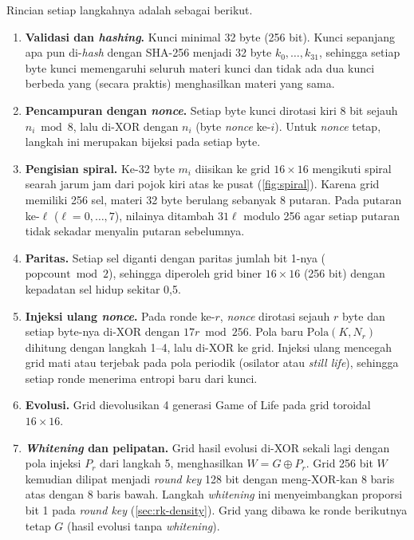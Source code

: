 Rincian setiap langkahnya adalah sebagai berikut.
\begin{enumerate}
    \item \textbf{Validasi dan \textit{hashing}.} Kunci minimal 32 byte (256 bit). Kunci sepanjang apa pun di-\textit{hash} dengan SHA-256 menjadi 32 byte $k_0, \dots, k_{31}$, sehingga setiap byte kunci memengaruhi seluruh materi kunci dan tidak ada dua kunci berbeda yang (secara praktis) menghasilkan materi yang sama.
    \item \textbf{Pencampuran dengan \textit{nonce}.} Setiap byte kunci dirotasi kiri 8 bit sejauh $n_i \bmod 8$, lalu di-XOR dengan $n_i$ (byte \textit{nonce} ke-$i$). Untuk \textit{nonce} tetap, langkah ini merupakan bijeksi pada setiap byte.
    \item \textbf{Pengisian spiral.} Ke-32 byte $m_i$ diisikan ke grid $16 \times 16$ mengikuti spiral searah jarum jam dari pojok kiri atas ke pusat (\cref{fig:spiral}). Karena grid memiliki 256 sel, materi 32 byte berulang sebanyak 8 putaran. Pada putaran ke-$\ell$ ($\ell = 0, \dots, 7$), nilainya ditambah $31\ell$ modulo 256 agar setiap putaran tidak sekadar menyalin putaran sebelumnya.
    \item \textbf{Paritas.} Setiap sel diganti dengan paritas jumlah bit 1-nya ($\mathrm{popcount} \bmod 2$), sehingga diperoleh grid biner $16 \times 16$ (256 bit) dengan kepadatan sel hidup sekitar 0,5.
    \item \textbf{Injeksi ulang \textit{nonce}.} Pada ronde ke-$r$, \textit{nonce} dirotasi sejauh $r$ byte dan setiap byte-nya di-XOR dengan $17r \bmod 256$. Pola baru $\mathrm{Pola}(K, N_r)$ dihitung dengan langkah 1--4, lalu di-XOR ke grid. Injeksi ulang mencegah grid mati atau terjebak pada pola periodik (osilator atau \textit{still life}), sehingga setiap ronde menerima entropi baru dari kunci.
    \item \textbf{Evolusi.} Grid dievolusikan 4 generasi Game of Life pada grid toroidal $16 \times 16$.
    \item \textbf{\textit{Whitening} dan pelipatan.} Grid hasil evolusi di-XOR sekali lagi dengan pola injeksi $P_r$ dari langkah 5, menghasilkan $W = G \oplus P_r$. Grid 256 bit $W$ kemudian dilipat menjadi \textit{round key} 128 bit dengan meng-XOR-kan 8 baris atas dengan 8 baris bawah. Langkah \textit{whitening} ini menyeimbangkan proporsi bit 1 pada \textit{round key} (\cref{sec:rk-density}). Grid yang dibawa ke ronde berikutnya tetap $G$ (hasil evolusi tanpa \textit{whitening}).
\end{enumerate}


